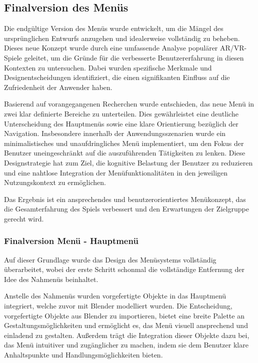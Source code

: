 \subsection{Finalversion des Menüs}
Die endgültige Version des Menüs wurde entwickelt, um die Mängel des ursprünglichen Entwurfs anzugehen und idealerweise
vollständig zu beheben. Dieses neue Konzept wurde durch eine umfassende Analyse populärer AR/VR-Spiele geleitet, um die
Gründe für die verbesserte Benutzererfahrung in diesen Kontexten zu untersuchen. Dabei wurden spezifische Merkmale und
Designentscheidungen identifiziert, die einen signifikanten Einfluss auf die Zufriedenheit der Anwender haben.

Basierend auf vorangegangenen Recherchen wurde entschieden, das neue Menü in zwei klar definierte Bereiche zu unterteilen.
Dies gewährleistet eine deutliche Unterscheidung des Hauptmenüs sowie eine klare Orientierung bezüglich der Navigation.
Insbesondere innerhalb der Anwendungsszenarien wurde ein minimalistisches und unaufdringliches Menü implementiert, um
den Fokus der Benutzer uneingeschränkt auf die auszuführenden Tätigkeiten zu lenken. Diese Designstrategie hat zum Ziel,
die kognitive Belastung der Benutzer zu reduzieren und eine nahtlose Integration der Menüfunktionalitäten in den jeweiligen
Nutzungskontext zu ermöglichen.

Das Ergebnis ist ein ansprechendes und benutzerorientiertes Menükonzept, das die Gesamterfahrung des Spiels verbessert
und den Erwartungen der Zielgruppe gerecht wird.

\subsubsection{Finalversion Menü - Hauptmenü}
Auf dieser Grundlage wurde das Design des Menüsystems vollständig überarbeitet, wobei der erste Schritt schonmal die
vollständige Entfernung der Idee des Nahmenüs beinhaltet.

Anstelle des Nahmenüs wurden vorgefertigte Objekte in das Hauptmenü integriert, welche zuvor mit Blender modelliert wurden.
Die Entscheidung, vorgefertigte Objekte aus Blender zu importieren, bietet eine breite Palette an Gestaltungsmöglichkeiten
und ermöglicht es, das Menü visuell ansprechend und einladend zu gestalten. Außerdem trägt die Integration dieser Objekte
dazu bei, das Menü intuitiver und zugänglicher zu machen, indem sie dem Benutzer klare Anhaltspunkte und Handlungsmöglichkeiten bieten.

